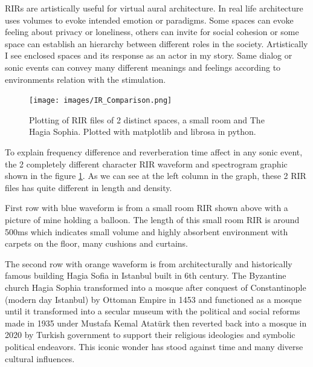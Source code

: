             RIRs are artistically useful for virtual aural architecture. In real life architecture uses volumes to evoke intended emotion or paradigms. Some spaces can evoke feeling about privacy or loneliness, others can invite for social cohesion or some space can establish an hierarchy between different roles in the society\cite{Spaces_Speak_Are_You_Listening?}. Artistically I see enclosed spaces and its response as an actor in my story. Same dialog or sonic events can convey many different meanings and feelings according to environments relation with the stimulation.\par

            \begin{figure}[H]
                \centering
                \texttt{[image: images/IR\_Comparison.png]}
                \caption{Plotting of RIR files of 2 distinct spaces, a small room and The Hagia Sophia. Plotted with matplotlib and librosa in python.}
                \label{fig:IR_COMP}
            \end{figure}

            To explain frequency difference and reverberation time affect in any sonic event, the 2 completely different character RIR waveform and spectrogram graphic shown in the figure \ref{fig:IR_COMP}. As we can see at the left column in the graph, these 2 RIR files has quite different in length and density.\par

            First row with blue waveform is from a small room RIR shown above with a picture of mine holding a balloon. The length of this small room RIR is around 500ms which indicates small volume and highly absorbent environment with carpets on the floor, many cushions and curtains.\par 
            
            The second row with orange waveform is from architecturally and historically famous building Hagia Sofia in Istanbul built in 6th century. The Byzantine church Hagia Sophia transformed into a mosque after conquest of Constantinople (modern day Istanbul) by Ottoman Empire in 1453 and functioned as a mosque until it transformed into a secular museum with the political and social reforms made in 1935 under Mustafa Kemal Atatürk then reverted back into a mosque in 2020 by Turkish government to support their religious ideologies and symbolic political endeavors\cite{Evolution_of_Hagia_Sophia}. This iconic wonder has stood against time and many diverse cultural influences.\par

